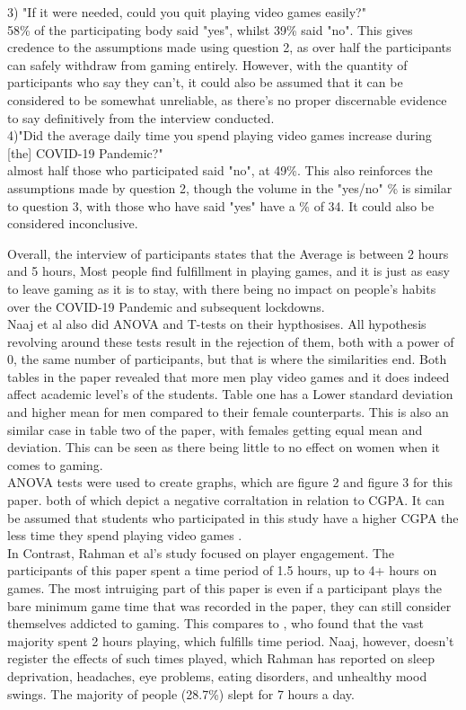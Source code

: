 \documentclass[conference]{IEEEtran}
\begin{document}
3) "If it were needed, could you quit playing video games easily?"\\
58\% of the participating body said "yes", whilst 39\% said "no". This gives credence to the assumptions made using question 2, as over half the participants can safely withdraw from gaming entirely. However, with the quantity of participants who say they can't, it could also be assumed that it can be considered to be somewhat unreliable, as there's no proper discernable evidence to say definitively from the interview conducted.\\ 
 
4)"Did the average daily time you spend playing video games increase during [the] COVID-19 Pandemic?"\\
almost half those who participated said "no", at 49\%. This also reinforces the assumptions made by question 2, though the volume in the "yes/no" \% is similar to question 3, with those who have said "yes" have a \% of 34. It could also be considered inconclusive.

Overall, the interview of participants states that the Average is between 2 hours and 5 hours, Most people find fulfillment in playing games, and it is just as easy to leave gaming as it is to stay, with there being no impact on people's habits over the COVID-19 Pandemic and subsequent lockdowns.\\

Naaj et al also did ANOVA and T-tests on their hypthosises. All hypothesis revolving around these tests result in the rejection of them, both with a power of 0, the same number of participants, but that is where the similarities end. Both tables in the paper revealed that more men play video games and it does indeed affect academic level's of the students. Table one has a Lower standard deviation and higher mean for men compared to their female counterparts. This is also an similar case in table two of the paper, with females getting equal mean and deviation. This can be seen as there being little to no effect on women when it comes to gaming.\\

ANOVA tests were used to create graphs, which are figure 2 and figure 3 for this paper. both of which depict a negative corraltation in relation to CGPA. It can be assumed that students who participated in this study have a higher CGPA the less time they spend playing video games \cite{Naaj2021}.\\

In Contrast, Rahman et al's \cite{Rahman2021} study focused on player engagement. The participants of this paper spent a time period of 1.5 hours, up to 4+ hours on games. The most intruiging part of this paper is even if a participant plays the bare minimum game time that was recorded in the paper, they can still consider themselves addicted to gaming. This compares to \cite{Naaj2021}, who found that the vast majority spent 2 hours playing, which fulfills \cite{Rahman2021} time period. Naaj, however, doesn't register the effects of such times played, which Rahman has reported on sleep deprivation, headaches, eye problems, eating disorders, and unhealthy mood swings. The majority of people (28.7\%) slept for 7 hours a day.\\
\end{document}
